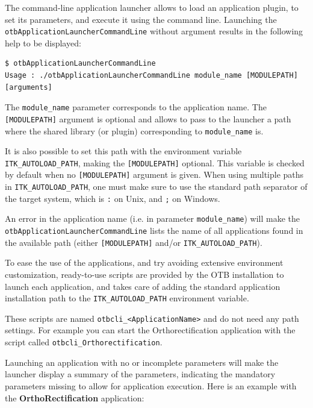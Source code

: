The command-line application launcher allows to load an application
plugin, to set its parameters, and execute it using the command
line. Launching the \verb?otbApplicationLauncherCommandLine?
without argument results in the following help to be displayed:

\begin{verbatim}
$ otbApplicationLauncherCommandLine 
Usage : ./otbApplicationLauncherCommandLine module_name [MODULEPATH] [arguments]
\end{verbatim} 

The \verb?module_name? parameter corresponds to the application
name. The \verb?[MODULEPATH]? argument is optional and allows 
to pass to the launcher a path where the shared library (or plugin) 
corresponding to \verb?module_name? is.

It is also possible to set this path with the environment variable 
\verb?ITK_AUTOLOAD_PATH?, making the \verb?[MODULEPATH]? optional.
This variable is checked by default when 
no \verb?[MODULEPATH]? argument is given.
When using multiple paths in \verb?ITK_AUTOLOAD_PATH?, one must make sure to use
the standard path separator of the target system, which is \verb?:? on Unix, and \verb?;? on Windows.


An error in the application name (i.e. in parameter
\verb?module_name?) will make the
\verb?otbApplicationLauncherCommandLine? lists the name of all
applications found in the available path (either \verb?[MODULEPATH]? 
and/or \verb?ITK_AUTOLOAD_PATH?).

To ease the use of the applications, and try avoiding extensive environment
customization, ready-to-use scripts are provided by the OTB installation
to launch each application, and takes care of adding the standard application
installation path to the \verb?ITK_AUTOLOAD_PATH? environment variable.

These scripts are named \verb?otbcli_<ApplicationName>? and do not need any path
settings. For example you can start the Orthorectification application
with the script called \verb?otbcli_Orthorectification?.


Launching an application with no or incomplete parameters will make the
launcher display a summary of the parameters, indicating the mandatory parameters
missing to allow for application execution. Here is an example
with the \textbf{OrthoRectification} application:

